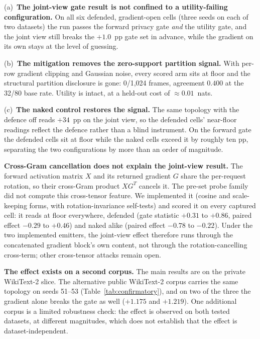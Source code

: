 \documentclass[11pt]{article}
\newcommand{\pp}{pp}
\begin{document}
(a)~\textbf{The joint-view gate result is not confined to a utility-failing
configuration.} On all six defended, gradient-open cells (three seeds on each
of two datasets) the run passes the forward privacy gate \emph{and} the
utility gate, and the joint view still breaks the $+1.0$~\pp{} gate set in advance,
while the gradient on its own stays at the level of guessing.

(b)~\textbf{The mitigation removes the zero-support partition signal.} With
per-row gradient clipping and Gaussian noise, every scored arm sits at floor
and the structural partition disclosure is gone: 0/1,024 frames, agreement
$0.400$ at the 32/80 base rate. Utility is intact, at a held-out cost of
$\approx 0.01$~nats.

(c)~\textbf{The naked control restores the signal.} The same topology with the
defence off reads $+34$~\pp{} on the joint view, so the defended cells'
near-floor readings reflect the defence rather than a blind instrument. On the
forward gate the defended cells sit at floor while the naked cells exceed it by
roughly ten \pp{}, separating the two configurations by more than an order of
magnitude.

\textbf{Cross-Gram cancellation does not explain the joint-view result.} The forward
activation matrix $X$ and its returned gradient $G$ share the per-request
rotation, so their cross-Gram product $XG^{T}$ cancels it. The pre-set probe family did not compute this cross-tensor feature. We implemented it (cosine and
scale-keeping forms, with
rotation-invariance self-tests) and scored it on every captured cell: it reads
at floor everywhere, defended (gate statistic $+0.31$ to $+0.86$, paired effect
$-0.29$ to $+0.46$) and naked alike (paired effect $-0.78$ to $-0.22$). Under
the two implemented emitters, the joint-view effect therefore runs through the
concatenated gradient block's own content, not through the rotation-cancelling
cross-term; other cross-tensor attacks remain open.

\textbf{The effect exists on a second corpus.} The main results are on the
private WikiText-2 slice. The alternative public WikiText-2 corpus carries the
same topology on seeds 51--53 (Table~\ref{tab:confirmatory}), and on two of the
three the gradient alone breaks the gate as well ($+1.175$ and $+1.219$). One
additional corpus is a limited robustness check: the effect is observed on both
tested datasets, at different magnitudes, which does not establish that the
effect is dataset-independent.
\end{document}
